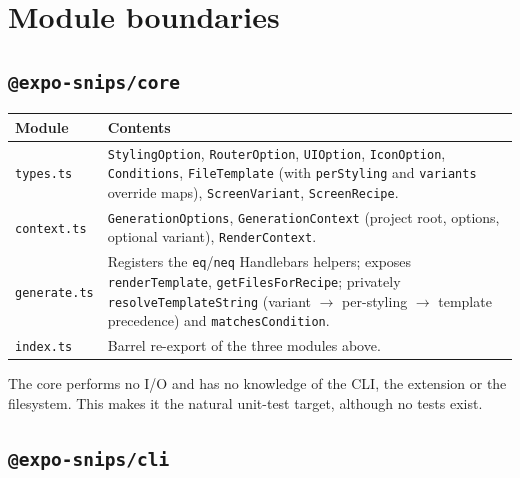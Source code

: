 \section{Module boundaries}

\subsection*{\texttt{@expo-snips/core}}

\begin{longtable}{p{2.8cm}p{11.2cm}}
\toprule
\textbf{Module} & \textbf{Contents} \\
\midrule
\endhead
\texttt{types.ts} & \texttt{StylingOption}, \texttt{RouterOption}, \texttt{UIOption},
\texttt{IconOption}, \texttt{Conditions}, \texttt{FileTemplate} (with
\texttt{perStyling} and \texttt{variants} override maps), \texttt{ScreenVariant},
\texttt{ScreenRecipe}. \\
\texttt{context.ts} & \texttt{GenerationOptions}, \texttt{GenerationContext}
(project root, options, optional variant), \texttt{RenderContext}. \\
\texttt{generate.ts} & Registers the \texttt{eq}/\texttt{neq} Handlebars helpers;
exposes \texttt{renderTemplate}, \texttt{getFilesForRecipe}; privately
\texttt{resolveTemplateString} (variant $\rightarrow$ per-styling $\rightarrow$
template precedence) and \texttt{matchesCondition}. \\
\texttt{index.ts} & Barrel re-export of the three modules above. \\
\bottomrule
\end{longtable}

The core performs no I/O and has no knowledge of the CLI, the extension or the
filesystem. This makes it the natural unit-test target, although no tests exist.

\subsection*{\texttt{@expo-snips/cli}}

